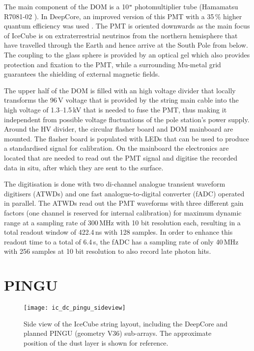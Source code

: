 The main component of the DOM is a 10\verb+"+ photomultiplier tube (Hamamatsu 
R7081-02 \cite{PMTpaper,PMTdata}). In DeepCore, an improved version of this PMT 
with a 35\,\% higher quantum efficiency was used \cite{DCDesign}. The PMT is 
oriented downwards as the main focus of IceCube is on extraterrestrial neutrinos 
from the northern hemisphere that have travelled through the Earth and hence 
arrive at the South Pole from below. The coupling to the glass sphere is 
provided by an optical gel which also provides protection and fixation to the 
PMT, while a surrounding Mu-metal grid guarantees the shielding of external 
magnetic fields.

The upper half of the DOM is filled with an high voltage divider that locally 
transforms the 96\,V voltage that is provided by the string main cable into the 
high voltage of 1.3--1.5\,kV that is needed to fuse the PMT, thus making it 
independent from possible voltage fluctuations of the pole station's power 
supply. Around the HV divider, the circular flasher board and DOM mainboard are 
mounted. The flasher board is populated with LEDs that can be used to produce a 
standardised signal for calibration. On the mainboard the electronics are 
located that are needed to read out the PMT signal and digitise the recorded 
data in situ, after which they are sent to the surface.

The digitisation is done with two di-channel analogue transient waveform
digitisers (ATWDs) and one fast analogue-to-digital converter (fADC) operated
in parallel. The ATWDs read out the PMT waveforms with three different gain
factors (one channel is reserved for internal calibration) for maximum dynamic
range at a sampling rate of 300\,MHz with 10 bit resolution each, resulting in
a total readout window of 422.4\,ns with 128 samples. In order to enhance this
readout time to a total of 6.4\,\textmu s, the fADC has a sampling rate of only
40\,MHz with 256 samples at 10 bit resolution to also record late photon hits.



\section{PINGU}
\label{sec:PINGU}

\begin{figure}[thp]
 \centering
 \texttt{[image: ic\_dc\_pingu\_sideview]}
 \caption{Side view of the IceCube string layout, including the DeepCore and
  planned PINGU (geometry V36) sub-arrays. The approximate position of the dust
  layer is shown for reference.}
 \label{fig:string_layout_side}
\end{figure}

